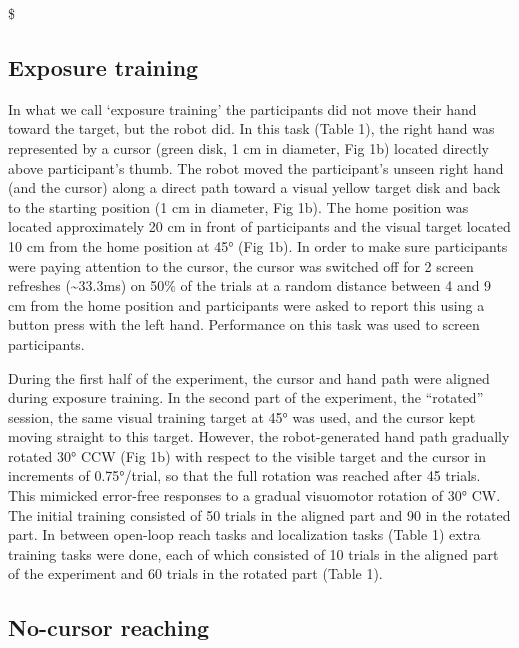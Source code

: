 \documentclass[10pt,letterpaper]{article}
\begin{document}
\$

\subsection{Exposure training}\label{exposure-training}

In what we call `exposure training' the participants did not move their
hand toward the target, but the robot did. In this task (Table 1), the
right hand was represented by a cursor (green disk, 1 cm in diameter,
Fig 1b) located directly above participant's thumb. The robot moved the
participant's unseen right hand (and the cursor) along a direct path
toward a visual yellow target disk and back to the starting position (1
cm in diameter, Fig 1b). The home position was located approximately 20
cm in front of participants and the visual target located 10 cm from the
home position at 45° (Fig 1b). In order to make sure participants were
paying attention to the cursor, the cursor was switched off for 2 screen
refreshes (\textasciitilde{}33.3ms) on 50\% of the trials at a random
distance between 4 and 9 cm from the home position and participants were
asked to report this using a button press with the left hand.
Performance on this task was used to screen participants.

During the first half of the experiment, the cursor and hand path were
aligned during exposure training. In the second part of the experiment,
the ``rotated'' session, the same visual training target at 45° was
used, and the cursor kept moving straight to this target. However, the
robot-generated hand path gradually rotated 30° CCW (Fig 1b) with
respect to the visible target and the cursor in increments of
0.75°/trial, so that the full rotation was reached after 45 trials. This
mimicked error-free responses to a gradual visuomotor rotation of 30°
CW. The initial training consisted of 50 trials in the aligned part and
90 in the rotated part. In between open-loop reach tasks and
localization tasks (Table 1) extra training tasks were done, each of
which consisted of 10 trials in the aligned part of the experiment and
60 trials in the rotated part (Table 1).

\subsection{No-cursor reaching}\label{no-cursor-reaching}
\end{document}
